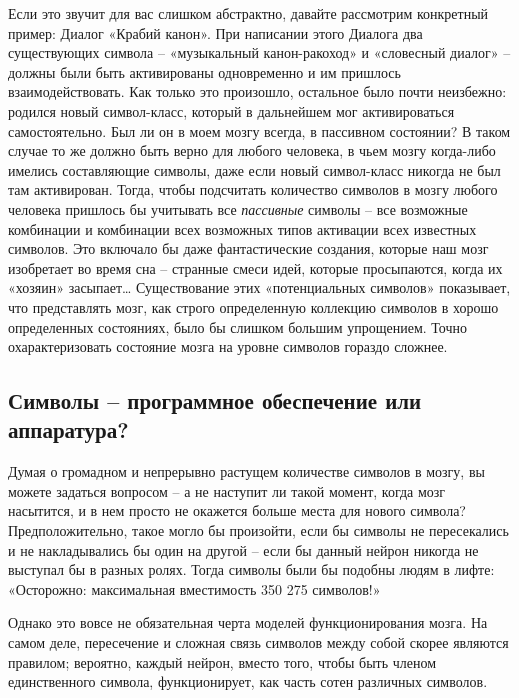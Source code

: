 \documentclass[../main.tex]{subfiles}
\begin{document}
Если это звучит для вас слишком абстрактно, давайте рассмотрим конкретный пример: Диалог «Крабий канон». При написании этого Диалога два существующих символа \--- «музыкальный канон-ракоход» и «словесный диалог» \--- должны были быть активированы одновременно и им пришлось взаимодействовать. Как только это произошло, остальное было почти неизбежно: родился новый символ-класс, который в дальнейшем мог активироваться самостоятельно. Был ли он в моем мозгу всегда, в пассивном состоянии? В таком случае то же должно быть верно для любого человека, в чьем мозгу когда-либо имелись составляющие символы, даже если новый символ-класс никогда не был там активирован. Тогда, чтобы подсчитать количество символов в мозгу любого человека пришлось бы учитывать все \emph{пассивные} символы \--- все возможные комбинации и комбинации всех возможных типов активации всех известных символов. Это включало бы даже фантастические создания, которые наш мозг изобретает во время сна \--- странные смеси идей, которые просыпаются, когда их «хозяин» засыпает\ldots{} Существование этих «потенциальных символов» показывает, что представлять мозг, как строго определенную коллекцию символов в хорошо определенных состояниях, было бы слишком большим упрощением. Точно охарактеризовать состояние мозга на уровне символов гораздо сложнее.


\subsection{Символы \--- программное обеспечение или аппаратура?}

Думая о громадном и непрерывно растущем количестве символов в мозгу, вы можете задаться вопросом \--- а не наступит ли такой момент, когда мозг насытится, и в нем просто не окажется больше места для нового символа? Предположительно, такое могло бы произойти, если бы символы не пересекались и не накладывались бы один на другой \--- если бы данный нейрон никогда не выступал бы в разных ролях. Тогда символы были бы подобны людям в лифте: «Осторожно: максимальная вместимость 350 275 символов!»

Однако это вовсе не обязательная черта моделей функционирования мозга. На самом деле, пересечение и сложная связь символов между собой скорее являются правилом; вероятно, каждый нейрон, вместо того, чтобы быть членом единственного символа, функционирует, как часть сотен различных символов.
\end{document}
